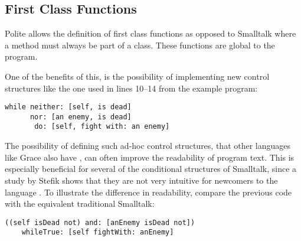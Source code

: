 \subsection {First Class Functions}
Polite allows the definition of first class functions as opposed to Smalltalk where a method must always be part of a class. These functions are global to the program. 

One of the benefits of this, is the possibility of implementing new control structures like the one used in lines 10--14 from the example program: 

\begin{verbatim}
while neither: [self, is dead] 
	  nor: [an enemy, is dead] 
	   do: [self, fight with: an enemy] 
\end{verbatim}

The possibility of defining such ad-hoc control structures, that other languages like Grace also have \cite{Grace12}, can often improve the readability of program text. This is especially beneficial for several of the conditional structures of Smalltalk, since a study by Stefik shows that they are not very intuitive for newcomers to the language \cite{Stef13}. To illustrate the difference in readability, compare the previous code with the equivalent traditional Smalltalk: 

\begin{verbatim}
((self isDead not) and: [anEnemy isDead not]) 
	whileTrue: [self fightWith: anEnemy]
\end{verbatim}




